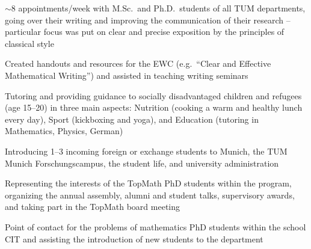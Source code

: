 \documentclass[a4paper,8pt]{extarticle}
\begin{document}
\begin{cvitems}
  \item ${\sim}8$ appointments/week with M.Sc.\ and Ph.D.\ students of all TUM departments, going over their writing and improving the communication of their research -- particular focus was put on clear and precise exposition by the principles of classical style
  \item Created handouts and resources for the EWC (e.g.\ ``Clear and Effective Mathematical Writing'') and assisted in teaching writing seminars
\end{cvitems}


\begin{cvitems}
  \item Tutoring and providing guidance to socially disadvantaged children and refugees (age 15--20) in three main aspects: Nutrition (cooking a warm and healthy lunch every day), Sport (kickboxing and yoga), and Education (tutoring in Mathematics, Physics, German)
\end{cvitems}

\begin{cvitems}
  \item Introducing 1--3 incoming foreign or exchange students to Munich, the TUM Munich Forschungscampus, the student life, and university administration
\end{cvitems}

\begin{cvitems}
  \item Representing the interests of the TopMath PhD students within the program, organizing the annual assembly, alumni and student talks, supervisory awards, and taking part in the TopMath board meeting
\end{cvitems}

\begin{cvitems}
  \item Point of contact for the problems of mathematics PhD students within the school CIT and assisting the introduction of new students to the department
\end{cvitems}
\end{document}
